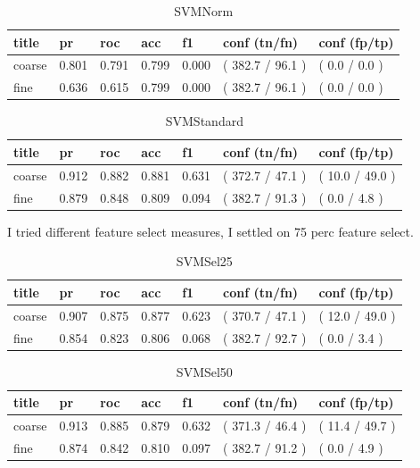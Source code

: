 \documentclass[ms]{nuthesis}
\begin{document}
\FloatBarrier
\begin{table}[h]
\centering
\begin{tabular}{|l||l||l||l||l||l||l|}\toprule
title & pr & roc & acc & f1 & conf (tn/fn) & conf (fp/tp) \\ \midrule
coarse & 0.801 & 0.791 & 0.799 & 0.000 & ( 382.7 / 96.1 ) & ( 0.0 / 0.0 ) \\
fine & 0.636 & 0.615 & 0.799 & 0.000 & ( 382.7 / 96.1 ) & ( 0.0 / 0.0 ) \\ \bottomrule
\end{tabular}
\caption{SVMNorm}
\label{tab:SVMNorm}
\end{table}
\FloatBarrier

\FloatBarrier
\begin{table}[h]
\centering
\begin{tabular}{|l||l||l||l||l||l||l|}\toprule
title & pr & roc & acc & f1 & conf (tn/fn) & conf (fp/tp) \\ \midrule
coarse & 0.912 & 0.882 & 0.881 & 0.631 & ( 372.7 / 47.1 ) & ( 10.0 / 49.0 ) \\
fine & 0.879 & 0.848 & 0.809 & 0.094 & ( 382.7 / 91.3 ) & ( 0.0 / 4.8 ) \\ \bottomrule
\end{tabular}
\caption{SVMStandard}
\label{tab:SVMStandard}
\end{table}
\FloatBarrier




\par I tried different feature select measures, I settled on 75 perc feature select.

\FloatBarrier
\begin{table}[h]
\centering
\begin{tabular}{|l||l||l||l||l||l||l|}\toprule
title & pr & roc & acc & f1 & conf (tn/fn) & conf (fp/tp) \\ \midrule
coarse & 0.907 & 0.875 & 0.877 & 0.623 & ( 370.7 / 47.1 ) & ( 12.0 / 49.0 ) \\
fine & 0.854 & 0.823 & 0.806 & 0.068 & ( 382.7 / 92.7 ) & ( 0.0 / 3.4 ) \\ \bottomrule
\end{tabular}
\caption{SVMSel25}
\label{tab:SVMSel25}
\end{table}
\FloatBarrier


\FloatBarrier
\begin{table}[h]
\centering
\begin{tabular}{|l||l||l||l||l||l||l|}\toprule
title & pr & roc & acc & f1 & conf (tn/fn) & conf (fp/tp) \\ \midrule
coarse & 0.913 & 0.885 & 0.879 & 0.632 & ( 371.3 / 46.4 ) & ( 11.4 / 49.7 ) \\
fine & 0.874 & 0.842 & 0.810 & 0.097 & ( 382.7 / 91.2 ) & ( 0.0 / 4.9 ) \\ \bottomrule
\end{tabular}
\caption{SVMSel50}
\label{tab:SVMSel50}
\end{table}
\FloatBarrier
\end{document}
